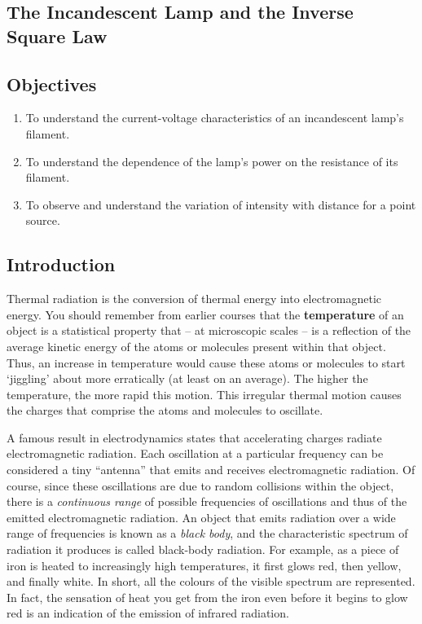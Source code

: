 \begin{refsection}
\chapter{The Incandescent Lamp and the Inverse Square Law}

\section*{Objectives}

\begin{enumerate}
\item To understand the current-voltage characteristics of an incandescent lamp's filament.
\item To understand the dependence of the lamp's power on the resistance of its filament.
\item To observe and understand the variation of intensity with distance for a point source.
\end{enumerate}




\section*{Introduction}

Thermal radiation is the conversion of thermal energy into electromagnetic energy. You should remember from earlier courses that the \textbf{temperature} of an object is a statistical property that -- at microscopic scales -- is a reflection of the average kinetic energy of the atoms or molecules present within that object. Thus, an increase in temperature would cause these atoms or molecules to start `jiggling' about more erratically (at least on an average). The higher the temperature, the more rapid this motion. This irregular thermal motion causes the charges that comprise the atoms and molecules to oscillate. 

A famous result in electrodynamics states that accelerating charges radiate electromagnetic radiation. Each oscillation at a particular frequency can be considered a tiny ``antenna'' that emits and receives electromagnetic radiation. Of course, since these oscillations are due to random collisions within the object, there is a \textit{continuous range} of possible frequencies of oscillations and thus of the emitted electromagnetic radiation. An object that emits radiation over a wide range of frequencies is known as a \textit{black body}, and the characteristic spectrum of radiation it produces is called black-body radiation. For example, as a piece of iron is heated to increasingly high temperatures, it first glows red, then yellow, and finally white. In short, all the colours of the visible spectrum are represented. In fact, the sensation of heat you get from the iron even before it begins to glow red is an indication of the emission of infrared radiation.


\end{refsection}

